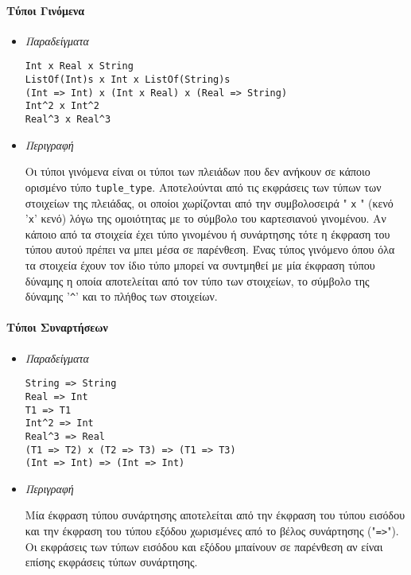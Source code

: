 \documentclass[diploma]{softlab-thesis}
\begin{document}
\newpage

\paragraph{Τύποι Γινόμενα}

\begin{itemize}
\item \textit{Παραδείγματα}
\begin{verbatim}
Int x Real x String
ListOf(Int)s x Int x ListOf(String)s
(Int => Int) x (Int x Real) x (Real => String)
Int^2 x Int^2
Real^3 x Real^3
\end{verbatim}

\item \textit{Περιγραφή}

Οι τύποι γινόμενα είναι οι τύποι των πλειάδων που δεν ανήκουν σε κάποιο
ορισμένο τύπο \verb|tuple_type|. Αποτελούνται από τις εκφράσεις των τύπων των
στοιχείων της πλειάδας, οι οποίοι χωρίζονται από την συμβολοσειρά " \verb|x| "
(κενό '\verb|x|' κενό) λόγω της ομοιότητας με το σύμβολο του καρτεσιανού
γινομένου. Αν κάποιο από τα στοιχεία έχει τύπο γινομένου ή συνάρτησης τότε η
έκφραση του τύπου αυτού πρέπει να μπει μέσα σε παρένθεση. Ένας τύπος γινόμενο
όπου όλα τα στοιχεία έχουν τον ίδιο τύπο μπορεί να συντμηθεί με μία έκφραση
τύπου δύναμης η οποία αποτελείται από τον τύπο των στοιχείων, το σύμβολο της
δύναμης '\verb|^|' και το πλήθος των στοιχείων.

\end{itemize}

\paragraph{Τύποι Συναρτήσεων}

\begin{itemize}
\item \textit{Παραδείγματα}
\begin{verbatim}
String => String
Real => Int
T1 => T1
Int^2 => Int
Real^3 => Real
(T1 => T2) x (T2 => T3) => (T1 => T3)
(Int => Int) => (Int => Int)
\end{verbatim}

\item \textit{Περιγραφή}

Μία έκφραση τύπου συνάρτησης αποτελείται από την έκφραση του τύπου εισόδου και
την έκφραση του τύπου εξόδου χωρισμένες από το βέλος συνάρτησης ("\verb|=>|").
Οι εκφράσεις των τύπων εισόδου και εξόδου μπαίνουν σε παρένθεση αν είναι
επίσης εκφράσεις τύπων συνάρτησης.

\end{itemize}
\end{document}
